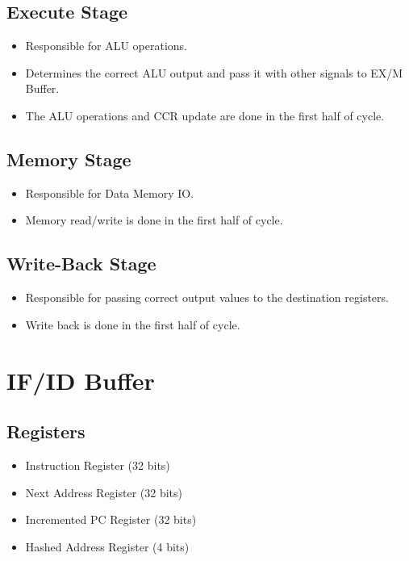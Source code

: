 \documentclass[12pt]{report}
\begin{document}
\subsection{Execute Stage}
\begin{itemize}
    \item Responsible for ALU operations.
    \item Determines the correct ALU output and pass it with other signals to EX/M Buffer.
    \item The ALU operations and CCR update are done in the first half of cycle.
\end{itemize}

\subsection{Memory Stage}
\begin{itemize}
    \item Responsible for Data Memory IO.
    \item Memory read/write is done in the first half of cycle.
\end{itemize}

\subsection{Write-Back Stage}
\begin{itemize}
    \item Responsible for passing correct output values to the destination registers.
    \item Write back is done in the first half of cycle.
\end{itemize}

\section{IF/ID Buffer}

\subsection{Registers}
\begin{itemize}
    \item Instruction Register (32 bits)
    \item Next Address Register (32 bits)
    \item Incremented PC Register (32 bits)
    \item Hashed Address Register (4 bits)
\end{itemize}
\end{document}

